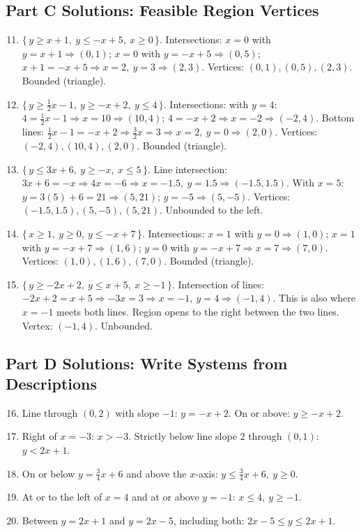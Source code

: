 \documentclass[12pt]{article}
\begin{document}
\subsection*{Part C Solutions: Feasible Region Vertices}
\begin{enumerate}
  \setcounter{enumi}{10}
  \item \(\{\,y\ge x+1,\ y\le -x+5,\ x\ge0\,\}\).  
  Intersections:  
  \(x=0\) with \(y=x+1 \Rightarrow (0,1)\); \(x=0\) with \(y=-x+5 \Rightarrow (0,5)\);  
  \(x+1=-x+5 \Rightarrow x=2,\ y=3 \Rightarrow (2,3)\).  
  Vertices: \((0,1), (0,5), (2,3)\). Bounded (triangle).

  \item \(\{\,y\ge \tfrac12 x-1,\ y\ge -x+2,\ y\le4\,\}\).  
  Intersections: with \(y=4\): \(4=\tfrac12 x-1 \Rightarrow x=10 \Rightarrow (10,4)\); \(4=-x+2 \Rightarrow x=-2 \Rightarrow (-2,4)\).  
  Bottom lines: \(\tfrac12 x-1=-x+2 \Rightarrow \tfrac32 x=3 \Rightarrow x=2,\ y=0 \Rightarrow (2,0)\).  
  Vertices: \((-2,4), (10,4), (2,0)\). Bounded (triangle).

  \item \(\{\,y\le 3x+6,\ y\ge -x,\ x\le5\,\}\).  
  Line intersection: \(3x+6=-x \Rightarrow 4x=-6 \Rightarrow x=-1.5,\ y=1.5 \Rightarrow (-1.5,1.5)\).  
  With \(x=5\): \(y=3(5)+6=21 \Rightarrow (5,21)\); \(y=-5 \Rightarrow (5,-5)\).  
  Vertices: \((-1.5,1.5), (5,-5), (5,21)\). Unbounded to the left.

  \item \(\{\,x\ge1,\ y\ge0,\ y\le -x+7\,\}\).  
  Intersections: \(x=1\) with \(y=0 \Rightarrow (1,0)\); \(x=1\) with \(y=-x+7 \Rightarrow (1,6)\);  
  \(y=0\) with \(y=-x+7 \Rightarrow x=7 \Rightarrow (7,0)\).  
  Vertices: \((1,0), (1,6), (7,0)\). Bounded (triangle).

  \item \(\{\,y\ge -2x+2,\ y\le x+5,\ x\ge -1\,\}\).  
  Intersection of lines: \(-2x+2=x+5 \Rightarrow -3x=3 \Rightarrow x=-1,\ y=4 \Rightarrow (-1,4)\).  
  This is also where \(x=-1\) meets both lines. Region opens to the right between the two lines.  
  Vertex: \((-1,4)\). Unbounded.
\end{enumerate}

\subsection*{Part D Solutions: Write Systems from Descriptions}
\begin{enumerate}
  \setcounter{enumi}{15}
  \item Line through \((0,2)\) with slope \(-1\): \(y=-x+2\). On or above: \(y\ge -x+2\).
  \item Right of \(x=-3\): \(x>-3\). Strictly below line slope \(2\) through \((0,1)\): \(y<2x+1\).
  \item On or below \(y=\tfrac34 x+6\) and above the \(x\)-axis: \(y\le \tfrac34 x+6,\ y\ge 0\).
  \item At or to the left of \(x=4\) and at or above \(y=-1\): \(x\le4,\ y\ge-1\).
  \item Between \(y=2x+1\) and \(y=2x-5\), including both: \(2x-5 \le y \le 2x+1\).
\end{enumerate}
\end{document}
